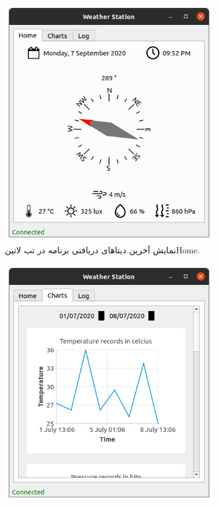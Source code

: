 \begin{figure}[!b]
	\begin{subfigure}[b]{0.5\textwidth}
		\includegraphics[width=\linewidth]{Assets/desktopAppHome.png}
		\caption{نمایش آخرین دیتاهای دریافتی برنامه در تب ‌لاتین{Home}.}
		\label{fig:desktopAppHome}
	\end{subfigure}
	\begin{subfigure}[b]{0.5\textwidth}
		\includegraphics[width=\linewidth]{Assets/desktopAppCharts.png}

\end{subfigure}
\end{figure}
